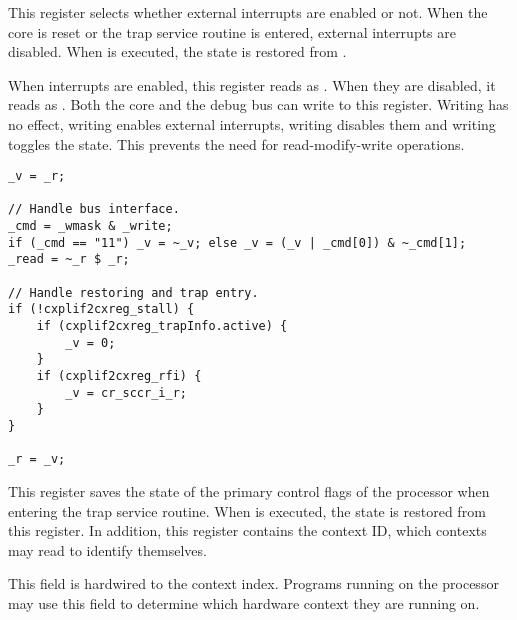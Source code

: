 This register selects whether external interrupts are enabled or not. When the 
core is reset or the trap service routine is entered, external interrupts are 
disabled. When  is executed, the state is restored from .

When interrupts are enabled, this register reads as . When they are 
disabled, it reads as . Both the core and the debug bus can write to 
this register. Writing  has no effect, writing  enables 
external interrupts, writing  disables them and writing  
toggles the state. This prevents the need for read-modify-write operations.

\declaration{}
\implementation{}
\begin{lstlisting}
_v = _r;

// Handle bus interface.
_cmd = _wmask & _write;
if (_cmd == "11") _v = ~_v; else _v = (_v | _cmd[0]) & ~_cmd[1];
_read = ~_r $ _r;

// Handle restoring and trap entry.
if (!cxplif2cxreg_stall) {
    if (cxplif2cxreg_trapInfo.active) {
        _v = 0;
    }
    if (cxplif2cxreg_rfi) {
        _v = cr_sccr_i_r;
    }
}

_r = _v;
\end{lstlisting}


This register saves the state of the primary control flags of the processor when
entering the trap service routine. When  is executed, the state is
restored from this register. In addition, this register contains the context ID,
which contexts may read to identify themselves.

This field is hardwired to the context index. Programs running on the \rvex{}
processor may use this field to determine which hardware context they are
running on.

